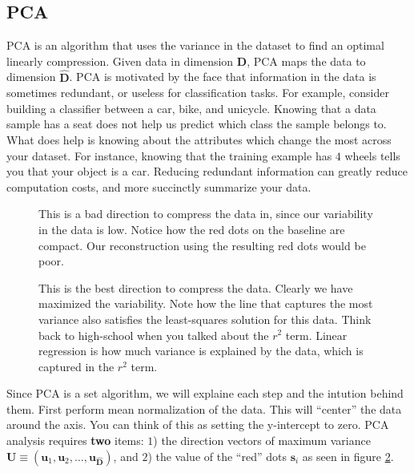\message{ !name(main.tex)}\documentclass[11pt]{article}
\begin{document}
\subsection{PCA}
PCA is an algorithm that uses the variance in the dataset to find an optimal linearly compression. Given data in dimension \textbf{D}, PCA maps the data to dimension $\mathbf{\hat{D}}$.
PCA is motivated by the face that information in the data is sometimes redundant, or useless for classification tasks. For example, consider building a classifier between a car, bike, and unicycle. Knowing that a data sample has a seat does not help us predict which class the sample belongs to. What does help is knowing about the attributes which change the most across your dataset. For instance, knowing that the training example has $4$ wheels tells you that your object is a car. Reducing redundant information can greatly reduce computation costs, and more succinctly summarize your data.

\begin{minipage}{0.47\linewidth}
  \begin{figure}[H]
    \centering
    
    \caption{This is a bad direction to compress the data in, since our variability in the data is low. Notice how the red dots on the baseline are compact. Our reconstruction using the resulting red dots would be poor.}
    \label{fig:pca_bad}
  \end{figure}
\end{minipage}\hfill
\begin{minipage}{0.47\linewidth}
  \begin{figure}[H]
    \centering
    
    \caption{This is the best direction to compress the data. Clearly we have maximized the variability. Note how the line that captures the most variance also satisfies the least-squares solution for this data. Think back to high-school when you talked about the $r^{2}$ term. Linear regression is how much variance is explained by the data, which is captured in the $r^{2}$ term.}
    \label{fig:pca_best}
  \end{figure}
\end{minipage}\vspace{0.5cm}

Since PCA is a set algorithm, we will explaine each step and the intution behind them. First perform mean normalization of the data. This will ``center'' the data around the axis. You can think of this as setting the y-intercept to zero. PCA analysis requires \textbf{two} items: $1$) the direction vectors of maximum variance $\mathbf{U} \equiv \left(\mathbf{u}_{1},\mathbf{u}_{2},\ldots,\mathbf{u}_{\mathbf{\hat{D}}}\right)$, and $2$) the value of the ``red'' dots $\mathbf{s}_{i}$ as seen in figure \ref{fig:pca_best}.
\end{document}
